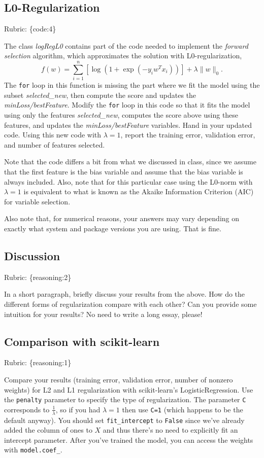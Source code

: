 \documentclass{article}
\def\rubric#1{\gre{Rubric: \{#1\}}}{}
\def\blu#1{{\color{blu}#1}}
\def\gre#1{{\color{gre}#1}}
\def\norm#1{\|#1\|}
\begin{document}
\subsection{L0-Regularization}
\rubric{code:4}

The class \emph{logRegL0} contains part of the code needed to implement the \emph{forward selection} algorithm,
which approximates the solution with L0-regularization,
\[
f(w) =  \sum_{i=1}^n \left[\log(1+\exp(-y_iw^Tx_i))\right] + \lambda\norm{w}_0.
\]
The \texttt{for} loop in this function is missing the part where we fit the model using the subset \emph{selected\_new},
then compute the score and updates the \emph{minLoss/bestFeature}.
Modify the \texttt{for} loop in this code so that it fits the model using only
the features \emph{selected\_new}, computes the score above using these features,
and updates the \emph{minLoss/bestFeature} variables.
\blu{Hand in your updated code. Using this new code with $\lambda=1$,
report the training error, validation error, and number of features selected.}

Note that the code differs a bit from what we discussed in class,
since we assume that the first feature is the bias variable and assume that the
bias variable is always included. Also, note that for this particular case using
the L0-norm with $\lambda=1$ is equivalent to what is known as the Akaike
Information Criterion (AIC) for variable selection.

Also note that, for numerical reasons, your answers may vary depending on exactly what system and package versions you are using. That is fine.

\subsection{Discussion}
\rubric{reasoning:2}

In a short paragraph, briefly discuss your results from the above. How do the
different forms of regularization compare with each other?
Can you provide some intuition for your results? No need to write a long essay, please!

\subsection{Comparison with scikit-learn}
\rubric{reasoning:1}

Compare your results (training error, validation error, number of nonzero weights) for L2 and L1 regularization with scikit-learn's LogisticRegression. Use the
\texttt{penalty} parameter to specify the type of regularization. The parameter \texttt{C} corresponds to $\frac{1}{\lambda}$, so if
you had $\lambda=1$ then use \texttt{C=1} (which happens to be the default anyway).
You should set \texttt{fit\string_intercept} to \texttt{False} since we've already added the column of ones to $X$ and thus
there's no need to explicitly fit an intercept parameter. After you've trained the model, you can access the weights
with \texttt{model.coef\string_}.
\end{document}
